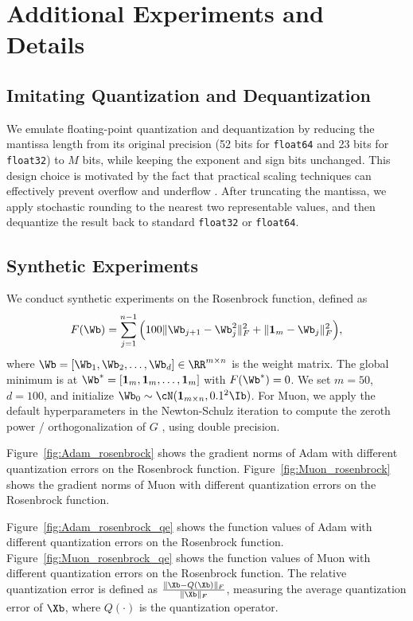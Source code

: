 \documentclass[11pt, letterpaper]{article}
\begin{document}
\section{Additional Experiments and Details}\label{app:exp}
\subsection{Imitating Quantization and Dequantization}
We emulate floating-point quantization and dequantization by reducing the mantissa length from its original precision (52 bits for \texttt{float64} and 23 bits for \texttt{float32}) to $M$ bits, while keeping the exponent and sign bits unchanged. 
This design choice is motivated by the fact that practical scaling techniques can effectively prevent overflow and underflow \citep{peng2023fp8}. 
After truncating the mantissa, we apply stochastic rounding to the nearest two representable values, and then dequantize the result back to standard \texttt{float32} or \texttt{float64}.



\subsection{Synthetic Experiments}
We conduct synthetic experiments on the Rosenbrock function, defined as
\begin{align*}
    F(\Wb) = \sum_{j=1}^{n-1} \Big( 100\|\Wb_{j+1} - \Wb_j^2\|_F^2 + \|\mathbf{1}_m-\Wb_j\|_F^2 \Big),
\end{align*}
where $\Wb = [\Wb_1,\Wb_2,\dots,\Wb_d] \in \RR^{m\times n}$ is the weight matrix. 
The global minimum is at $\Wb^* = [\mathbf{1}_m, \mathbf{1}_m, \dots, \mathbf{1}_m]$ with $F(\Wb^*)=0$. 
We set $m=50$, $d=100$, and initialize $\Wb_0 \sim \cN(\mathbf{1}_{m\times n}, 0.1^2 \Ib)$. 
For Muon, we apply the default hyperparameters in the Newton-Schulz iteration to compute the zeroth power / orthogonalization of $G$ \citep{jordan2024muon}, using double precision.


Figure~\ref{fig:Adam_rosenbrock} shows the gradient norms of Adam with different quantization errors on the Rosenbrock function. Figure~\ref{fig:Muon_rosenbrock} shows the gradient norms of Muon with different quantization errors on the Rosenbrock function. 

Figure~\ref{fig:Adam_rosenbrock_qe} shows the function values of Adam with different quantization errors on the Rosenbrock function. Figure~\ref{fig:Muon_rosenbrock_qe} shows the function values of Muon with different quantization errors on the Rosenbrock function. The relative quantization error is defined as $\frac{\|\Xb - Q(\Xb)\|_F}{\|\Xb\|_F}$, measuring the average quantization error of $\Xb$, where $Q(\cdot)$ is the quantization operator.
\end{document}
